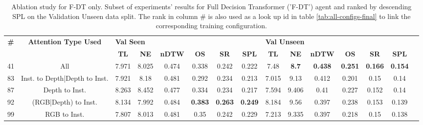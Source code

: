 \begin{table}
\centering
\caption{\label{tab:f_dt_full_dt_ablation}Ablation study for F-DT only. Subset of experiments' results for Full Decision Transformer ('F-DT') agent and ranked by descending SPL on the Validation Unseen data split. The rank in column \# is also used as a look up id in table \ref{tab:all-configs-final} to link the corresponding training configuration.}
\begin{tabular}{@{\hskip3pt}c@{\hskip3pt}c@{\hskip3pt}c@{\hskip3pt}c@{\hskip3pt}c@{\hskip3pt}c@{\hskip3pt}c@{\hskip3pt}c@{\hskip3pt}c@{\hskip3pt}c@{\hskip3pt}c@{\hskip3pt}c@{\hskip3pt}c@{\hskip3pt}c@{\hskip3pt}c}
\toprule
\textbf{\#} &   \textbf{Attention Type Used} & \multicolumn{6}{l}{\textbf{Val Seen}} & \multicolumn{6}{l}{\textbf{Val Unseen}} \\
 \textbf{~} &                     \textbf{~} &       \textbf{TL} &    \textbf{NE} &   \textbf{nDTW} &     \textbf{OS} &     \textbf{SR} &    \textbf{SPL} &         \textbf{TL} &   \textbf{NE} &   \textbf{nDTW} &     \textbf{OS} &     \textbf{SR} &    \textbf{SPL} \\
\midrule
         41 &                            All &             7.971 &          8.025 &           0.474 &           0.338 &           0.242 &           0.222 &                7.48 &  \textbf{8.7} &  \textbf{0.438} &  \textbf{0.251} &  \textbf{0.166} &  \textbf{0.154} \\
         83 &  Inst. to Depth|Depth to Inst. &             7.921 &           8.18 &           0.481 &           0.292 &           0.234 &           0.213 &               7.015 &          9.13 &           0.412 &           0.201 &            0.15 &            0.14 \\
         87 &                 Depth to Inst. &             8.263 &          8.452 &           0.477 &           0.334 &           0.234 &           0.217 &               7.594 &         9.406 &            0.41 &           0.227 &           0.152 &            0.14 \\
         92 &           (RGB|Depth) to Inst. &             8.134 &          7.992 &           0.484 &  \textbf{0.383} &  \textbf{0.263} &  \textbf{0.249} &               8.184 &          9.56 &           0.397 &           0.238 &           0.153 &           0.139 \\
         99 &                   RGB to Inst. &             7.807 &          8.013 &           0.481 &            0.35 &           0.242 &           0.229 &               7.213 &         9.335 &           0.397 &           0.218 &            0.15 &           0.138 \\

\end{tabular}
\end{table}
